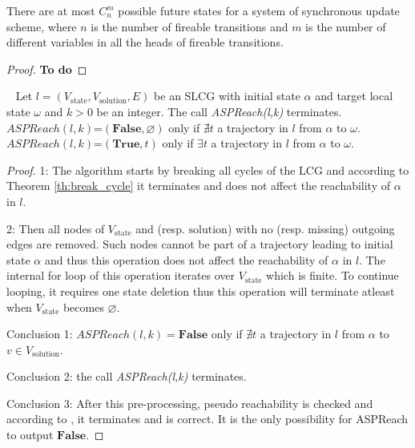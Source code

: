 \begin{theorem}
    There are at most $C_n^m$ possible future states for a system of synchronous update scheme, where $n$ is the number of fireable transitions and $m$ is the number of different variables in all the heads of fireable transitions. 
    \begin{proof}
        \textbf{To do}
    \end{proof}
\end{theorem}

\begin{theorem} ~
    Let $l=(V_{\mathrm{state}}, V_{\mathrm{solution}}, E)$ be an SLCG with initial state $\alpha$ and target local state $\omega$ and $k > 0$ be an integer.
    The call \textit{ASPReach(l,k)} terminates.\\
    $ASPReach(l,k)$=$(\mathbf{False},\varnothing)$ only if $\nexists t$ a trajectory in $l$ from $\alpha$ to $\omega$.\\
    $ASPReach(l,k)$=$(\mathbf{True},t)$ only if $\exists t$ a trajectory in $l$ from $\alpha$ to $\omega$.
    \begin{proof}
    
        1: The algorithm starts by breaking all cycles of the LCG and according to Theorem \ref{th:break_cycle} it terminates and does not affect the reachability of $\alpha$ in $l$.
        
        2: Then all nodes of $V_{\mathrm{state}}$ and (resp. ${\mathrm{solution}}$) with no (resp. missing) outgoing edges are removed.
        Such nodes cannot be part of a trajectory leading to initial state $\alpha$ and thus this operation does not affect the reachability of $\alpha$ in $l$.
        The internal for loop of this operation iterates over $V_{\mathrm{state}}$ which is finite.
        To continue looping, it requires one state deletion thus this operation will terminate atleast when $V_{\mathrm{state}}$ becomes $\varnothing$.
        
        Conclusion 1: $ASPReach(l,k)=\mathbf{False}$ only if $\nexists t$ a trajectory in $l$ from $\alpha$ to $v \in V_{\mathrm{solution}}$.
        
        Conclusion 2: the call \textit{ASPReach(l,k)} terminates.
        
        Conclusion 3: After this pre-processing, pseudo reachability is checked and according to \cite{pauleve2012}, it terminates and is correct.
        It is the only possibility for ASPReach to output $\mathbf{False}$.
        

\end{proof}
\end{theorem}
